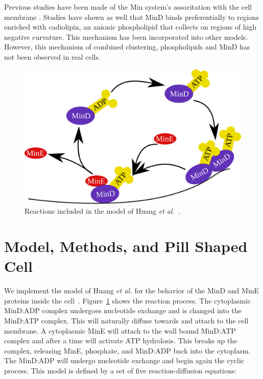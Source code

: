\documentclass[letterpaper,twocolumn,amsmath,amssymb,pre]{revtex4-1}
\begin{document}
Previous studies have been made of the Min system's associtation with
the cell membrane
\cite{hsieh2010direct}\cite{mileykovskaya2003effects}.  Studies have
shown as well that MinD binds preferentially to regions enriched with
cadiolipin, an anionic phospholipid that collects on regions of high
negative curvature. This mechanism has been incorporated into other
models.\cite{drew2005polymerization,cytrynbaum2007multistranded,renner2012mind,renner2012mind}
However, this mechanism of combined clustering, phospholipids and MinD
has not been observed in real cells. \cite{halatek2012highly}


\begin{figure}
  \includegraphics[width=\columnwidth]{reactions}
  \caption{Reactions included in the model of Huang \emph{et
      al.}~\cite{huang2003dynamic}.}\label{fig:reactions}
\end{figure}


\section{Model, Methods, and Pill Shaped Cell}
We implement the model of Huang \emph{et al.}  for the behavior of the
MinD and MinE proteins inside the cell~\cite{huang2003dynamic}.
Figure~\ref{fig:reactions} shows the reaction process.  The
cytoplasmic MinD:ADP complex undergoes nucleotide exchange and is
changed into the MinD:ATP complex.  This will naturally diffuse
towards and attach to the cell membrane.  A cytoplasmic MinE will
attach to the wall bound MinD:ATP complex and after a time will
activate ATP hydrolosis.  This breaks up the complex, releasing MinE,
phosphate, and MinD:ADP back into the cytoplasm.  The MinD:ADP will undergo
nucleotide exchange and begin again the cyclic process.  This model is
defined by a set of five reaction-diffusion equations:
\end{document}
